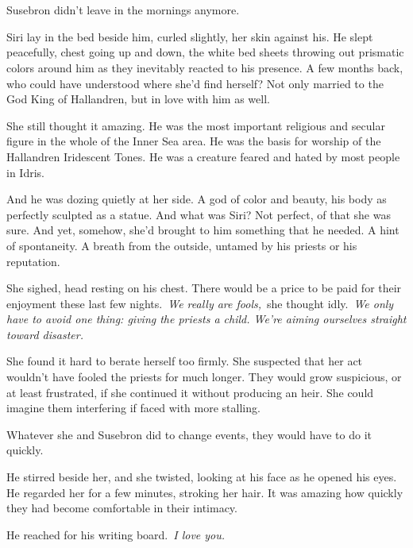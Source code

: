 \chapter{}

Susebron didn’t leave in the mornings anymore.

Siri lay in the bed beside him, curled slightly, her skin against his. He slept peacefully, chest going up and down, the white bed sheets throwing out prismatic colors around him as they inevitably reacted to his presence. A few months back, who could have understood where she’d find herself? Not only married to the God King of Hallandren, but in love with him as well.

She still thought it amazing. He was the most important religious and secular figure in the whole of the Inner Sea area. He was the basis for worship of the Hallandren Iridescent Tones. He was a creature feared and hated by most people in Idris.

And he was dozing quietly at her side. A god of color and beauty, his body as perfectly sculpted as a statue. And what was Siri? Not perfect, of that she was sure. And yet, somehow, she’d brought to him something that he needed. A hint of spontaneity. A breath from the outside, untamed by his priests or his reputation.

She sighed, head resting on his chest. There would be a price to be paid for their enjoyment these last few nights.~\textit{We really are fools,}~she thought idly.~\textit{We only have to avoid one thing: giving the priests a child. We’re aiming ourselves straight toward disaster.}

She found it hard to berate herself too firmly. She suspected that her act wouldn’t have fooled the priests for much longer. They would grow suspicious, or at least frustrated, if she continued it without producing an heir. She could imagine them interfering if faced with more stalling.

Whatever she and Susebron did to change events, they would have to do it quickly.

He stirred beside her, and she twisted, looking at his face as he opened his eyes. He regarded her for a few minutes, stroking her hair. It was amazing how quickly they had become comfortable in their intimacy.

He reached for his writing board.~\textit{I love you.}

